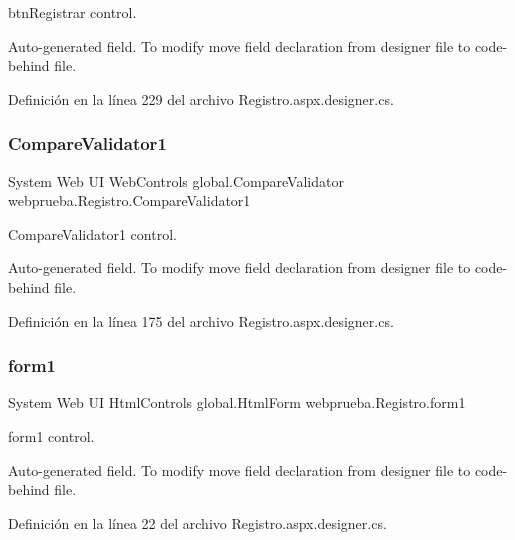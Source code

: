 btn\+Registrar control. 

Auto-\/generated field. To modify move field declaration from designer file to code-\/behind file. 

Definición en la línea 229 del archivo Registro.\+aspx.\+designer.\+cs.

\mbox{\label{classwebprueba_1_1_registro_a768895011ffad1b0697ab853401c9bc3}} 
\subsubsection{\texorpdfstring{CompareValidator1}{CompareValidator1}}
{\footnotesize\ttfamily System Web UI Web\+Controls global.\+Compare\+Validator webprueba.\+Registro.\+Compare\+Validator1\hspace{0.3cm}{\ttfamily [protected]}}



Compare\+Validator1 control. 

Auto-\/generated field. To modify move field declaration from designer file to code-\/behind file. 

Definición en la línea 175 del archivo Registro.\+aspx.\+designer.\+cs.

\mbox{\label{classwebprueba_1_1_registro_a3ad67c63e60fd93af018cf83ef29c7a7}} 
\subsubsection{\texorpdfstring{form1}{form1}}
{\footnotesize\ttfamily System Web UI Html\+Controls global.\+Html\+Form webprueba.\+Registro.\+form1\hspace{0.3cm}{\ttfamily [protected]}}



form1 control. 

Auto-\/generated field. To modify move field declaration from designer file to code-\/behind file. 

Definición en la línea 22 del archivo Registro.\+aspx.\+designer.\+cs.

\mbox{\label{classwebprueba_1_1_registro_ad2c6a3f182fe442ffc96eb83434b4bbb}} 
